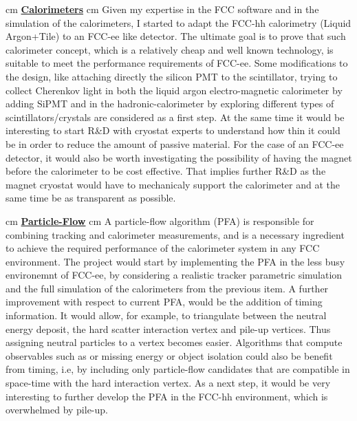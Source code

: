 \documentclass[12pt]{article}
\begin{document}
 cm
\noindent
\underline{\bf Calorimeters}
 cm
\noindent
Given my expertise in the FCC software and in the simulation of the calorimeters, I started to adapt the FCC-hh calorimetry (Liquid Argon+Tile) to an FCC-ee like detector. The ultimate goal is to prove that such calorimeter concept, which is a relatively cheap and well known technology, is suitable to meet the performance requirements of FCC-ee. Some modifications to the design, like attaching directly the silicon PMT to the scintillator, trying to collect Cherenkov light in both the liquid argon electro-magnetic calorimeter by adding SiPMT and in the hadronic-calorimeter by exploring different types of scintillators/crystals are considered as a first step. At the same time it would be interesting to start R\&D with cryostat experts to understand how thin it could be in order to reduce the amount of passive material. For the case of an FCC-ee detector, it would also be worth investigating the possibility of having the magnet before the calorimeter to be cost effective. That implies further R\&D as the magnet cryostat would have to mechanicaly support the calorimeter and at the same time be as transparent as possible.


 cm
\noindent
\underline{\bf Particle-Flow}
 cm
\noindent
A particle-flow algorithm (PFA) is responsible for combining tracking and calorimeter measurements, and is a necessary ingredient to achieve the required performance of the calorimeter system in any FCC environment. The project would start by implementing the PFA in the less busy environemnt of FCC-ee, by considering a realistic tracker parametric simulation and the full simulation of the calorimeters from the previous item. A further improvement with respect to current PFA, would be the addition of timing information. It would allow, for example, to triangulate between the neutral energy deposit, the hard scatter interaction vertex and pile-up vertices. Thus assigning neutral particles to a vertex becomes easier. Algorithms that compute observables such as or missing energy or object isolation could also be benefit from timing, i.e, by including only particle-flow candidates that are compatible in space-time with the hard interaction vertex. As a next step, it would be very interesting to further develop the PFA in the FCC-hh environment, which is overwhelmed by pile-up.
\end{document}
